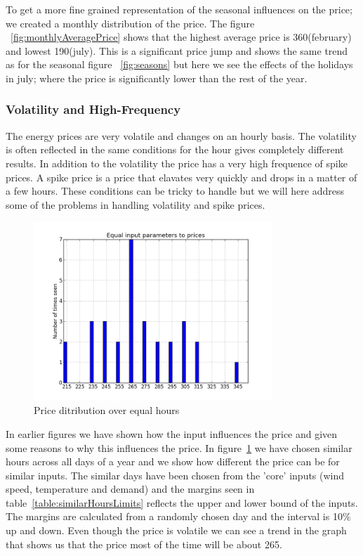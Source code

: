 To get a more fine grained representation of the seasonal influences on the price; we created a monthly distribution of the price. The figure ~\ref{fig:monthlyAveragePrice} shows that the highest average price is 360(february) and lowest 190(july). This is a significant price jump and shows the same trend as for the seasonal figure ~\ref{fig:seasons} but here we see the effects of the holidays in july; where the price is significantly lower than the rest of the year.

\subsubsection{Volatility and High-Frequency}
The energy prices are very volatile and changes on an hourly basis. The volatility is often reflected in the same conditions for the hour gives completely different results. In addition to the volatility the price has a very high frequence of spike prices. A spike price is a price that elavates very quickly and drops in a matter of a few hours. These conditions can be tricky to handle but we will here address some of the problems in handling volatility and spike prices.

\begin{figure}[H]
\centering
\includegraphics[width=0.8\textwidth ,natwidth=410,natheight=237]{billeder/energy_price_plots/same_hour_distribution.png}
\caption{Price ditribution over equal hours}
\label{fig:same_hour_distribution}
\end{figure}

In earlier figures we have shown how the input influences the price and given some reasons to why this influences the price. In figure~\ref{fig:same_hour_distribution} we have chosen similar hours across all days of a year and we show how different the price can be for similar inputs. The similar days have been chosen from the 'core' inputs (wind speed, temperature and demand) and the margins seen in table~\ref{table:similarHoursLimits} reflects the upper and lower bound of the inputs. The margins are calculated from a randomly chosen day and the interval is 10\% up and down. Even though the price is volatile we can see a trend in the graph that shows us that the price most of the time will be about 265.

